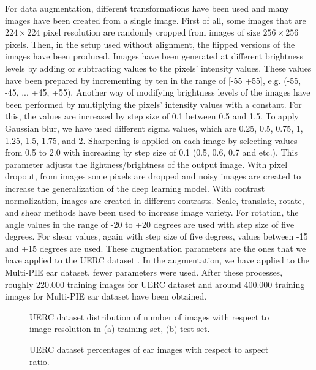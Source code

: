 \documentclass[11pt,journal,compsoc]{IEEEtran}
\begin{document}
For data augmentation, different transformations have been used and many images have been created from a single image. First of all, some images that are $224 \times 224$ pixel resolution are randomly cropped from images of size $256 \times 256$ pixels. Then, in the setup used without alignment, the flipped versions of the images have been produced. Images have been generated at different brightness levels by adding or subtracting values to the pixels' intensity values. These values have been prepared by incrementing by ten in the range of [-55 +55], e.g. (-55, -45, ... +45, +55). Another way of modifying brightness levels of the images have been performed by multiplying the pixels' intensity values with a constant. For this, the values are increased by step size of 0.1 between 0.5 and 1.5. To apply Gaussian blur, we have used different sigma values, which are 0.25, 0.5, 0.75, 1, 1.25, 1.5, 1.75, and 2. 
Sharpening is applied on each image by selecting values from 0.5 to 2.0 with increasing by step size of 0.1 (0.5, 0.6, 0.7 and etc.). This parameter adjusts the lightness/brightness of the output image.
With pixel dropout, from images 
some pixels are dropped and noisy images are created to increase the generalization of the deep learning model. With contrast normalization, images are created in different contrasts. Scale, translate, rotate, and shear methods have been used to increase image variety. For rotation, the angle values in the range of -20 to +20 degrees are used with step size of five degrees. For shear values, again with step size of five degrees, values between -15 and +15 degrees are used. These augmentation parameters are the ones that we have applied to the UERC dataset \cite{Emersic_2017_b}. In the augmentation, we have applied to the Multi-PIE ear dataset, fewer parameters were used. After these processes, roughly 220.000 training images for UERC dataset \cite{Emersic_2017_b} and around 400.000 training images for Multi-PIE ear dataset have been obtained.

\begin{figure*}[t]
	\caption{UERC dataset distribution of number of images with respect to image resolution in (a) training set, (b) test set.}
	\label{fig_UERC_resolution}
\end{figure*}

\begin{figure}[t]
	\caption{UERC dataset percentages of ear images with respect to aspect ratio.}
	\label{fig_aspect_ratio}
\end{figure}
\end{document}
